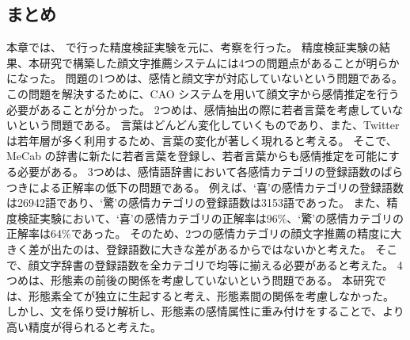 \documentclass[11pt,a4j]{jsarticle}
\begin{document}
\subsection{ まとめ}
本章では、 で行った精度検証実験を元に、考察を行った。
精度検証実験の結果、本研究で構築した顔文字推薦システムには4つの問題点があることが明らかになった。
問題の1つめは、感情と顔文字が対応していないという問題である。
この問題を解決するために、CAO システムを用いて顔文字から感情推定を行う必要があることが分かった。
2つめは、感情抽出の際に若者言葉を考慮していないという問題である。
言葉はどんどん変化していくものであり、また、Twitter は若年層が多く利用するため、言葉の変化が著しく現れると考える。
そこで、MeCab の辞書に新たに若者言葉を登録し、若者言葉からも感情推定を可能にする必要がある。
3つめは、感情語辞書において各感情カテゴリの登録語数のばらつきによる正解率の低下の問題である。
例えば、`喜'の感情カテゴリの登録語数は26942語であり、`驚'の感情カテゴリの登録語数は3153語であった。
また、精度検証実験において、`喜'の感情カテゴリの正解率は96\%、`驚'の感情カテゴリの正解率は64\%であった。
そのため、2つの感情カテゴリの顔文字推薦の精度に大きく差が出たのは、登録語数に大きな差があるからではないかと考えた。
そこで、顔文字辞書の登録語数を全カテゴリで均等に揃える必要があると考えた。
4つめは、形態素の前後の関係を考慮していないという問題である。
本研究では、形態素全てが独立に生起すると考え、形態素間の関係を考慮しなかった。
しかし、文を係り受け解析し、形態素の感情属性に重み付けをすることで、より高い精度が得られると考えた。
\end{document}
